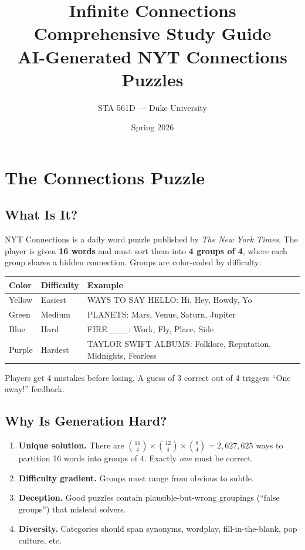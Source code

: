 \documentclass[11pt, letterpaper]{article}
\title{\textbf{Infinite Connections}\\[6pt]
\Large Comprehensive Study Guide\\[4pt]
\large AI-Generated NYT Connections Puzzles}
\author{STA 561D --- Duke University}
\date{Spring 2026}
\begin{document}
\maketitle
\thispagestyle{fancy}
\tableofcontents
\newpage

\section{The Connections Puzzle}

\subsection{What Is It?}

NYT Connections is a daily word puzzle published by \emph{The New York Times}. The player is given \textbf{16 words} and must sort them into \textbf{4 groups of 4}, where each group shares a hidden connection. Groups are color-coded by difficulty:

\begin{center}
\begin{tabular}{@{}lll@{}}
\toprule
Color & Difficulty & Example \\
\midrule
\colorbox{yellow_conn}{Yellow} & Easiest & WAYS TO SAY HELLO: Hi, Hey, Howdy, Yo \\
\colorbox{green_conn}{Green} & Medium & PLANETS: Mars, Venus, Saturn, Jupiter \\
\colorbox{blue_conn}{Blue} & Hard & FIRE \_\_\_: Work, Fly, Place, Side \\
\colorbox{purple_conn}{Purple} & Hardest & TAYLOR SWIFT ALBUMS: Folklore, Reputation, Midnights, Fearless \\
\bottomrule
\end{tabular}
\end{center}

Players get 4 mistakes before losing. A guess of 3 correct out of 4 triggers ``One away!'' feedback.

\subsection{Why Is Generation Hard?}

\begin{enumerate}[nosep]
    \item \textbf{Unique solution.} There are $\binom{16}{4} \times \binom{12}{4} \times \binom{8}{4} = 2{,}627{,}625$ ways to partition 16 words into groups of 4. Exactly \emph{one} must be correct.
    \item \textbf{Difficulty gradient.} Groups must range from obvious to subtle.
    \item \textbf{Deception.} Good puzzles contain plausible-but-wrong groupings (``false groups'') that mislead solvers.
    \item \textbf{Diversity.} Categories should span synonyms, wordplay, fill-in-the-blank, pop culture, etc.
\end{enumerate}
\end{document}
